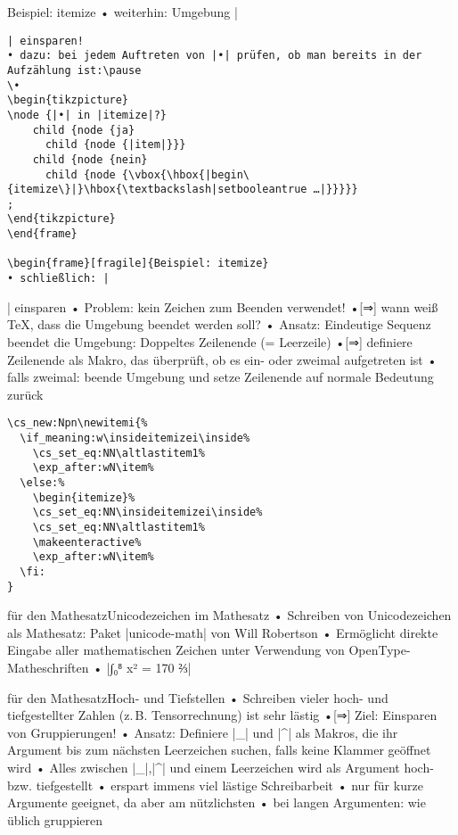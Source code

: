 \documentclass[t]{beamer}
\begin{document}
\begin{frame}[fragile]{Beispiel: itemize}
• weiterhin: Umgebung |\begin{verbatim}| einsparen!
• dazu: bei jedem Auftreten von |•| prüfen, ob man bereits in der Aufzählung ist:\pause
\•
\begin{tikzpicture}
\node {|•| in |itemize|?}
    child {node {ja}
      child {node {|item|}}}
    child {node {nein}
      child {node {\vbox{\hbox{|begin\{itemize\}|}\hbox{\textbackslash|setbooleantrue …|}}}}}
;
\end{tikzpicture}
\end{frame}

\begin{frame}[fragile]{Beispiel: itemize}
• schließlich: |\end{verbatim}| einsparen
• Problem: kein Zeichen zum Beenden verwendet!
•[⇒] wann weiß \TeX, dass die Umgebung beendet werden soll?\pause
• Ansatz: Eindeutige Sequenz beendet die Umgebung: Doppeltes Zeilenende (= Leerzeile)
•[⇒] definiere Zeilenende als Makro, das überprüft, ob es ein- oder zweimal aufgetreten ist
• falls zweimal: beende Umgebung und setze Zeilenende auf normale Bedeutung zurück
\•
\end{frame}

\begin{frame}[fragile]
\begin{verbatim}
\cs_new:Npn\newitemi{%
  \if_meaning:w\insideitemizei\inside%
    \cs_set_eq:NN\altlastitem1%
    \exp_after:wN\item%
  \else:%
    \begin{itemize}%
    \cs_set_eq:NN\insideitemizei\inside%
    \cs_set_eq:NN\altlastitem1%
    \makeenteractive%
    \exp_after:wN\item%
  \fi:
}
\end{verbatim}
\end{frame}

\begin{frame}[fragile]{\altTeX für den Mathesatz}{Unicodezeichen im Mathesatz}
• Schreiben von Unicodezeichen als Mathesatz: Paket |unicode-math| von Will Robertson\pause
• Ermöglicht direkte Eingabe aller mathematischen Zeichen unter Verwendung von OpenType-Matheschriften
• |∫₀⁸ x² = 170 ⅔|
\•
\end{frame}

\begin{frame}[fragile]{\altTeX für den Mathesatz}{Hoch- und Tiefstellen}
• Schreiben vieler hoch- und tiefgestellter Zahlen (z.\,B. Tensorrechnung) ist sehr lästig
•[⇒] Ziel: Einsparen von Gruppierungen!
• Ansatz: Definiere |_| und |^| als Makros, die ihr Argument bis zum nächsten Leerzeichen suchen, falls keine Klammer geöffnet wird
• Alles zwischen |_|,|^| und einem Leerzeichen wird als Argument hoch- bzw. tiefgestellt
• erspart immens viel lästige Schreibarbeit
• nur für kurze Argumente geeignet, da aber am nützlichsten
• bei langen Argumenten: wie üblich gruppieren
\•
\end{frame}
\end{document}
